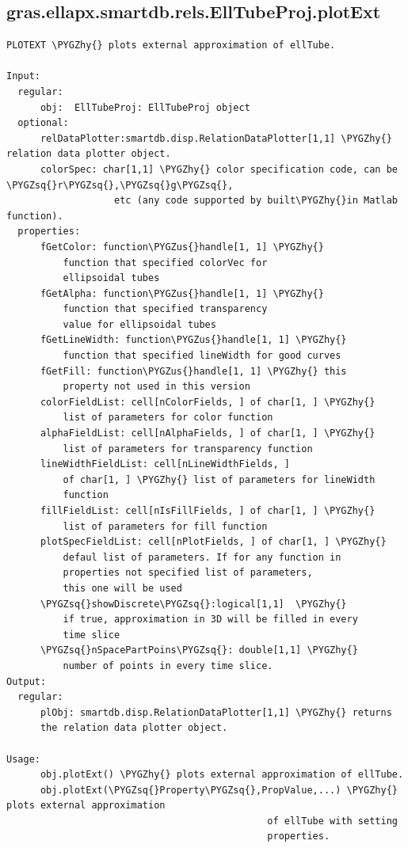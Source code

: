 \documentclass[letterpaper,10pt,english]{sphinxmanual}
\def\PYGZus{\char`\_}
\def\PYGZhy{\char`\-}
\def\PYGZsq{\char`\'}
\begin{document}
\subsection{gras.ellapx.smartdb.rels.EllTubeProj.plotExt}
\label{chap_functions:gras-ellapx-smartdb-rels-elltubeproj-plotext}
\begin{Verbatim}[commandchars=\\\{\}]
PLOTEXT \PYGZhy{} plots external approximation of ellTube.

Input:
  regular:
      obj:  EllTubeProj: EllTubeProj object
  optional:
      relDataPlotter:smartdb.disp.RelationDataPlotter[1,1] \PYGZhy{} relation data plotter object.
      colorSpec: char[1,1] \PYGZhy{} color specification code, can be \PYGZsq{}r\PYGZsq{},\PYGZsq{}g\PYGZsq{},
                   etc (any code supported by built\PYGZhy{}in Matlab function).
  properties:
      fGetColor: function\PYGZus{}handle[1, 1] \PYGZhy{}
          function that specified colorVec for
          ellipsoidal tubes
      fGetAlpha: function\PYGZus{}handle[1, 1] \PYGZhy{}
          function that specified transparency
          value for ellipsoidal tubes
      fGetLineWidth: function\PYGZus{}handle[1, 1] \PYGZhy{}
          function that specified lineWidth for good curves
      fGetFill: function\PYGZus{}handle[1, 1] \PYGZhy{} this
          property not used in this version
      colorFieldList: cell[nColorFields, ] of char[1, ] \PYGZhy{}
          list of parameters for color function
      alphaFieldList: cell[nAlphaFields, ] of char[1, ] \PYGZhy{}
          list of parameters for transparency function
      lineWidthFieldList: cell[nLineWidthFields, ]
          of char[1, ] \PYGZhy{} list of parameters for lineWidth
          function
      fillFieldList: cell[nIsFillFields, ] of char[1, ] \PYGZhy{}
          list of parameters for fill function
      plotSpecFieldList: cell[nPlotFields, ] of char[1, ] \PYGZhy{}
          defaul list of parameters. If for any function in
          properties not specified list of parameters,
          this one will be used
      \PYGZsq{}showDiscrete\PYGZsq{}:logical[1,1]  \PYGZhy{}
          if true, approximation in 3D will be filled in every
          time slice
      \PYGZsq{}nSpacePartPoins\PYGZsq{}: double[1,1] \PYGZhy{}
          number of points in every time slice.
Output:
  regular:
      plObj: smartdb.disp.RelationDataPlotter[1,1] \PYGZhy{} returns
      the relation data plotter object.

Usage:
      obj.plotExt() \PYGZhy{} plots external approximation of ellTube.
      obj.plotExt(\PYGZsq{}Property\PYGZsq{},PropValue,...) \PYGZhy{} plots external approximation
                                              of ellTube with setting
                                              properties.
\end{Verbatim}
\end{document}
